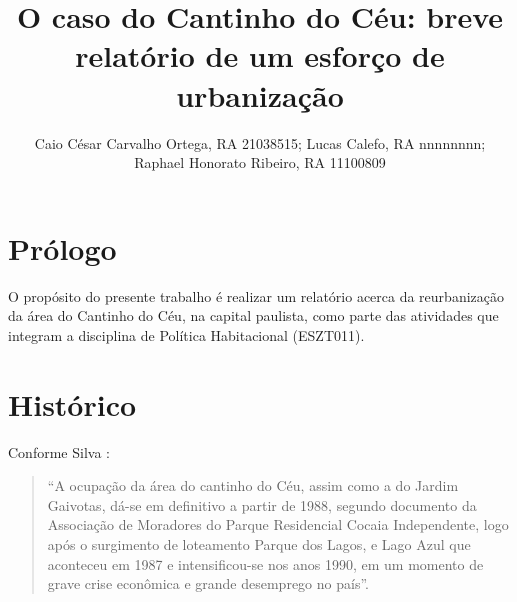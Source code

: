 \documentclass[hidelinks,a4paper,nofootinbib,aps,reprint,superscriptaddress,twocolumn]{revtex4}
\begin{document}
	
	\title{O caso do Cantinho do Céu: breve relatório de um esforço de urbanização}
	
	
	
	
	\author{Caio César Carvalho Ortega, RA 21038515; Lucas Calefo, RA nnnnnnnn; Raphael Honorato Ribeiro, RA 11100809}
	
	
	\maketitle
	
	\section{Prólogo}
	
	O propósito do presente trabalho é realizar um relatório acerca da reurbanização da área do Cantinho do Céu, na capital paulista, como parte das atividades que integram a disciplina de Política Habitacional (ESZT011).
	
	\section{Histórico}
	
	Conforme Silva \cite[p.80]{Silva2016}:
	
	\begin{quote}
		``A ocupação da área do cantinho do Céu, assim como a do Jardim Gaivotas, dá-se em definitivo a partir de 1988, segundo documento da Associação de Moradores do Parque Residencial Cocaia Independente, logo após o surgimento de loteamento Parque dos Lagos, e Lago Azul que aconteceu em 1987 e intensificou-se nos anos 1990, em um momento de grave crise econômica e grande desemprego no país''.
	\end{quote}
	
\end{document}
